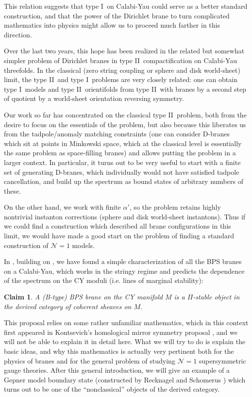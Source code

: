 \documentclass[a4paper,12pt]{amsart}
\numberwithin{equation}{section}
\theoremstyle{plain}
\newtheorem{claim}[theorem]{Claim}
\theoremstyle{definition}
\def\cal{\mathcal}
\def \I {I}
\def \II {II}
\def\CN{{\cal N}}
\begin{document}
This relation suggests that type \I\ on Calabi-Yau could serve as a
better standard construction, and that the power of the Dirichlet brane
to turn complicated mathematics into physics might allow us to proceed
much farther in this direction.

Over the last two years, this hope has been realized in the related
but somewhat simpler problem of Dirichlet branes in type \II\
compactification on Calabi-Yau threefolds.  In the classical (zero
string coupling or sphere and disk world-sheet) limit, the type \II\
and type \I\ problems are very closely related: one can obtain type
\I\ models and type \II\ orientifolds from type \II\ with branes by a
second step of quotient by a world-sheet orientation reversing symmetry.

Our work so far has concentrated on the classical type \II\ problem,
both from the desire to focus on the essentials of the problem, but
also because this liberates us from the tadpole/anomaly matching
constraints (one can consider D-branes which sit at points in
Minkowski space, which at the classical level is essentially the same
problem as space-filling branes) and allows putting the problem in a
larger context.  In particular, it turns out to be very useful to
start with a finite set of generating D-branes, which individually
would not have satisfied tadpole cancellation, and build up the
spectrum as bound states of arbitrary numbers of these.

On the other hand, we work with finite $\alpha'$, so the problem
retains highly nontrivial instanton corrections (sphere and disk
world-sheet instantons).  Thus if we could find a construction which
described all brane configurations in this limit, we would have made a
good start on the problem of finding a standard construction of
$\CN=1$ models.

In \cite{DCS}, building on \cite{BDLR,DD,Doug,DFR,DFRtwo}, we have
found a simple characterization of all the BPS branes on a Calabi-Yau,
which works in the stringy regime and predicts the dependence of the
spectrum on the CY moduli (i.e. lines of marginal stability):

\begin{claim}
A (B-type) BPS brane on the CY manifold $M$ is a $\Pi$-stable
object in the derived category of coherent sheaves on $M$.
\end{claim}

This proposal relies on some rather unfamiliar mathematics, which in
this context first appeared in Kontsevich's homological mirror
symmetry proposal \cite{Kontsevich}, and we will not be able to
explain it in detail here.  What we will try to do is explain the
basic ideas, and why this mathematics is actually very pertinent both
for the physics of branes and for the general problem of studying
$\CN=1$ supersymmetric gauge theories.  After this general
introduction, we will give an example of a Gepner model boundary state
(constructed by Recknagel and Schomerus \cite{RS}) which turns out to
be one of the ``nonclassical'' objects of the derived category.
\end{document}
